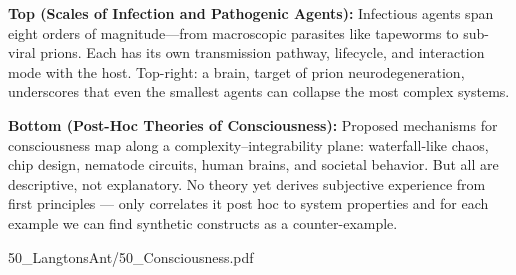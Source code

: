 \begin{SideNotePage}{
  \textbf{Top (Scales of Infection and Pathogenic Agents):}  
  Infectious agents span eight orders of magnitude—from macroscopic parasites like tapeworms to sub-viral prions. Each has its own transmission pathway, lifecycle, and interaction mode with the host. Top-right: a brain, target of prion neurodegeneration, underscores that even the smallest agents can collapse the most complex systems. \par

  \textbf{Bottom (Post-Hoc Theories of Consciousness):}  
  Proposed mechanisms for consciousness map along a complexity–integrability plane: waterfall-like chaos, chip design, nematode circuits, human brains, and societal behavior. But all are descriptive, not explanatory. No theory yet derives subjective experience from first principles — only correlates it post hoc to system properties and for each example we can find synthetic constructs as a counter-example. \par
}{50_LangtonsAnt/50_Consciousness.pdf}
\end{SideNotePage}

